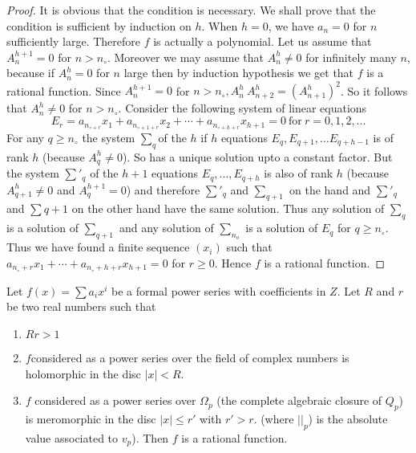 \begin{proof}
  It is obvious that the condition is necessary. We shall prove that
  the condition is sufficient by induction on $h$. When $h=0$, we have
  $a_n=0$ for $n$ sufficiently large. Therefore $f$ is actually a
  polynomial. Let us assume that $A^{h+1}_n=0$ for
  $n>n_{\circ}$. Moreover we may assume that $A^{h}_n\neq0$ for
  infinitely many $n$, because if $A^{h}_n=0$ for $n$ large then by
  induction hypothesis we get that $f$ is a rational
  function. Since\pageoriginale 
  $A^{h+1}_n=0$ for $n>n_{\circ}, A_n^h ~ A^h_{n+2} =
  \left(A^h_{n+1}\right)^2$. So it follows that $A^h_n \neq 0$ for $n >
  n_\circ$. Consider the following system of linear equations 
  $$
  E_r=a_{n_{\circ+r}}
  x_1+a_{n_{\circ+1+r}} x_2+\cdots+a_{n_{\circ+h+r}} x_{h+1}=0
  ~\text{for}~ r=0,1,2,... 
  $$
  For any $q\geq n_{\circ}$ the system $\sum_q$of the $h$ if $h$
  equations $E_q, E_{q+1}, \ldots E_{q+h-1}$ is of rank $h$ (because
  $A_{q}^{h}\neq 0$). So has a unique solution upto a constant factor.
  But the system $\sum'_q$ of the $h+1$ equations $E_q,\ldots ,
  E_{q+h}$ is also of rank $h$ (because $A_{q+1}^h \neq 0$ and
  $A^{h+1}_{q}=0$) and therefore $\sum'_q$ and
  $\sum_{q+1}$ on the hand and $\sum'_q$ and $\sum q+1$ on the other hand
  have the same solution. Thus any solution of $\sum_q$  is a solution
  of $\sum_{q+1}$ and any solution of $\sum_{n_o}$ is a solution of
  $E_{q}$ for $q\geq n_\circ$. Thus we have found a finite sequence
  $(x_i)$ such that $a_{n_\circ+r}x_1+\cdots+a_{n_\circ+h+r}x_{h+1}=0$ for
  $r\geq 0$. Hence $f$ is a rational function. 
\end{proof}

\setcounter{theorem}{0}
\begin{theorem}\label{part3:chap1:sec3:thm1}
  Let $f(x)=\sum a_i x^i$ be a formal power series with coefficients in
  $Z$. Let $R$ and $r$ be two real numbers such that  
  \begin{enumerate}[\rm (1)]
  \item $R r >1$
  \item $f$\pageoriginale considered as a power series over the field of complex
    numbers is holomorphic in the disc $|x|<R$. 
  \item $f$ considered as a power series over $\Omega_p$ (the complete
    algebraic closure of $Q_p$) is meromorphic in the disc $|x|\leq r'$
    with $r'>r$. (where $||_p$) is the absolute value associated to
    $v_p$). Then $f$ is a rational function.  
  \end{enumerate}
\end{theorem}

